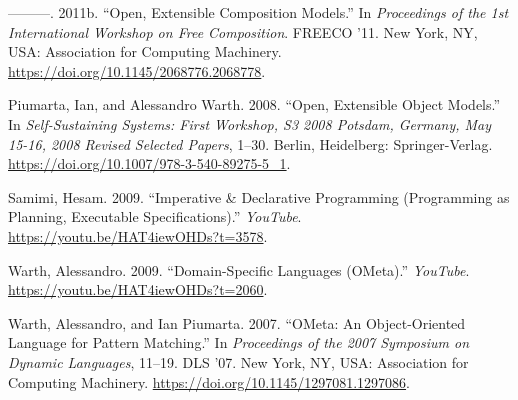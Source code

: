 \begin{CSLReferences}{1}{0}
\leavevmode{}%
---------. 2011b. {``Open, Extensible Composition Models.''} In
\emph{Proceedings of the 1st International Workshop on Free
Composition}. FREECO '11. New York, NY, USA: Association for Computing
Machinery. \url{https://doi.org/10.1145/2068776.2068778}.

\leavevmode{}%
Piumarta, Ian, and Alessandro Warth. 2008. {``Open, Extensible Object
Models.''} In \emph{Self-Sustaining Systems: First Workshop, S3 2008
Potsdam, Germany, May 15-16, 2008 Revised Selected Papers}, 1--30.
Berlin, Heidelberg: Springer-Verlag.
\url{https://doi.org/10.1007/978-3-540-89275-5_1}.

\leavevmode{}%
Samimi, Hesam. 2009. {``Imperative \& Declarative Programming
(Programming as Planning, Executable Specifications).''} \emph{YouTube}.
\url{https://youtu.be/HAT4iewOHDs?t=3578}.

\leavevmode{}%
Warth, Alessandro. 2009. {``Domain-Specific Languages (OMeta).''}
\emph{YouTube}. \url{https://youtu.be/HAT4iewOHDs?t=2060}.

\leavevmode{}%
Warth, Alessandro, and Ian Piumarta. 2007. {``OMeta: An Object-Oriented
Language for Pattern Matching.''} In \emph{Proceedings of the 2007
Symposium on Dynamic Languages}, 11--19. DLS '07. New York, NY, USA:
Association for Computing Machinery.
\url{https://doi.org/10.1145/1297081.1297086}.

\end{CSLReferences}
